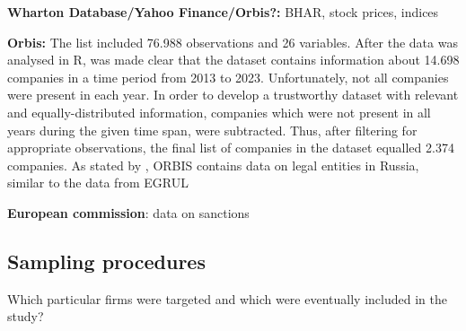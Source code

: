 \documentclass[12pt,a4paper]{article}
\begin{document}

\textbf{Wharton Database/Yahoo Finance/Orbis?:} BHAR, stock prices, indices 


\textbf{Orbis:} The list included 76.988 observations and 26 variables. After the data was analysed in R, was made clear that the dataset contains information about 14.698 companies in a time period from 2013 to 2023. Unfortunately, not all companies were present in each year. In order to develop a trustworthy dataset with relevant and equally-distributed information, companies which were not present in all years during the given time span, were subtracted. Thus, after filtering for appropriate observations, the final list of companies in the dataset equalled 2.374 companies. As stated by \cite{sonnenfeld_it_2022}, ORBIS contains data on legal entities in Russia, similar to the data from EGRUL  

\textbf{European commission}: data on sanctions
\subsection{Sampling procedures}
Which particular firms were targeted and which were eventually included in the study?
\end{document}
